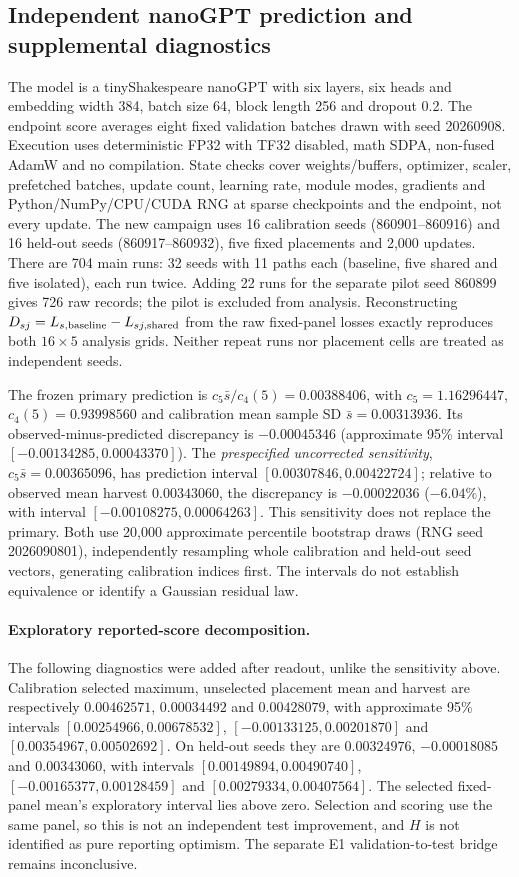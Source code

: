 \documentclass[10pt,letterpaper]{article}
\theoremstyle{remark}
\begin{document}
\subsection{Independent nanoGPT prediction and supplemental diagnostics}
\label{sec:nanogpt-supplement}
The model is a tinyShakespeare nanoGPT with six layers, six heads and
embedding width 384, batch size 64, block length 256 and dropout 0.2.
The endpoint score averages eight fixed validation batches drawn with seed
20260908. Execution uses deterministic FP32 with TF32 disabled, math SDPA,
non-fused AdamW and no compilation. State checks cover weights/buffers,
optimizer, scaler, prefetched batches, update count, learning rate, module
modes, gradients and Python/NumPy/CPU/CUDA RNG at sparse checkpoints and the
endpoint, not every update.
The new campaign uses 16 calibration seeds (860901--860916) and 16
held-out seeds (860917--860932), five fixed placements and 2,000 updates.
There are 704 main runs: 32 seeds with 11 paths each (baseline, five shared
and five isolated), each run twice. Adding 22 runs for the separate pilot
seed 860899 gives 726 raw records; the pilot is excluded from analysis. Reconstructing
$D_{sj}=L_{s,\rm baseline}-L_{sj,\rm shared}$ from the raw fixed-panel
losses exactly reproduces both $16\times5$ analysis grids. Neither repeat
runs nor placement cells are treated as independent seeds.

The frozen primary prediction is $c_5\bar s/c_4(5)=0.00388406$, with
$c_5=1.16296447$, $c_4(5)=0.93998560$ and calibration mean sample SD
$\bar s=0.00313936$. Its observed-minus-predicted discrepancy is
$-0.00045346$ (approximate 95\% interval
$[-0.00134285,0.00043370]$). The \emph{prespecified uncorrected
sensitivity}, $c_5\bar s=0.00365096$, has prediction interval
$[0.00307846,0.00422724]$; relative to observed mean harvest $0.00343060$,
the discrepancy is $-0.00022036$ ($-6.04\%$), with interval
$[-0.00108275,0.00064263]$. This sensitivity does not replace the primary.
Both use 20,000 approximate percentile bootstrap draws (RNG seed
2026090801), independently resampling whole calibration and held-out seed
vectors, generating calibration indices first. The intervals do not
establish equivalence or identify a Gaussian residual law.

\paragraph{Exploratory reported-score decomposition.}
The following diagnostics were added after readout, unlike the sensitivity
above. Calibration selected maximum, unselected placement mean and harvest
are respectively $0.00462571$, $0.00034492$ and $0.00428079$, with
approximate 95\% intervals $[0.00254966,0.00678532]$,
$[-0.00133125,0.00201870]$ and $[0.00354967,0.00502692]$.
On held-out seeds they are $0.00324976$, $-0.00018085$ and $0.00343060$,
with intervals $[0.00149894,0.00490740]$,
$[-0.00165377,0.00128459]$ and $[0.00279334,0.00407564]$.
The selected fixed-panel mean's exploratory interval lies above zero.
Selection and scoring use the same panel, so this is not an independent
test improvement, and $H$ is not identified as pure reporting optimism.
The separate E1 validation-to-test bridge remains inconclusive.
\end{document}
